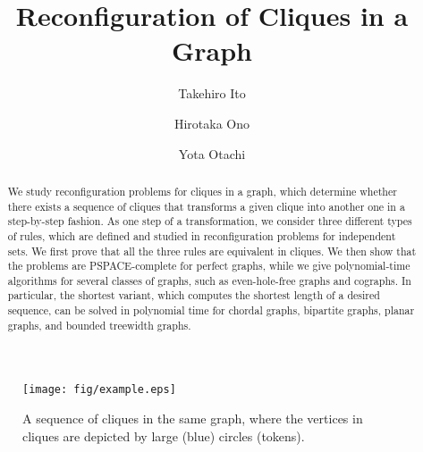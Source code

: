 \documentclass{llncs}
\newcounter{one}
\newcounter{three}
\begin{document}
\title{Reconfiguration of Cliques in a Graph}

\author{
Takehiro Ito \and 
Hirotaka Ono \and
Yota Otachi
}


\maketitle

	\begin{abstract}
	We study reconfiguration problems for cliques in a graph, which determine whether there exists a sequence of cliques that transforms a given clique into another one in a step-by-step fashion. 
	As one step of a transformation, we consider three different types of rules, which are defined and studied in reconfiguration problems for independent sets.
	We first prove that all the three rules are equivalent in cliques.
	We then show that the problems are PSPACE-complete for perfect graphs, while we give polynomial-time algorithms for several classes of graphs, such as even-hole-free graphs and cographs.  
	In particular, the shortest variant, which computes the shortest length of a desired sequence, can be solved in polynomial time for chordal graphs, bipartite graphs, planar graphs, and bounded treewidth graphs.
	\end{abstract}
\vspace{-2em}

	\begin{figure}[b]
	\vspace{-1em}
		\centering
		\texttt{[image: fig/example.eps]}
	\vspace{-1em}
	\caption{A sequence  of cliques in the same graph, where the vertices in cliques are depicted by large (blue) circles (tokens).}
\label{fig:example}
	\end{figure}
\end{document}
